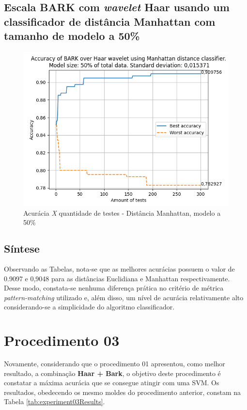 		\newpage
		\subsection{Escala BARK com \textit{wavelet} Haar usando um classificador de distância Manhattan com tamanho de modelo a 50\%}
			\begin{figure}[ht]
				\centering
				\includegraphics{images/results/confusionMatrices/classifier_Manhattan_50.png}
				\caption{Acurácia \textit{X} quantidade de testes - Distância Manhattan, modelo a 50\%}
				\label{fig:classifiermanhattan50}
			\end{figure}
			
			
		\subsection{Síntese}
			\par Observando as Tabelas, nota-se que as melhores acurácias possuem o valor de 0.9097 e 0,9048 para as distâncias Euclidiana e Manhattan respectivamente.  Desse modo, constata-se nenhuma diferença prática no critério de métrica \textit{pattern-matching} utilizado e, além disso, um nível de acurácia relativamente alto considerando-se a simplicidade do algoritmo classificador.
	
	\section{Procedimento 03}
		\label{chap:testsResults:sec:Experimento03}
		\par Novamente, considerando que o procedimento 01 apresentou, como melhor resultado, a combinação \textbf{Haar + Bark}, o objetivo deste procedimento é constatar a máxima acurácia que se consegue atingir com uma SVM. Os resultados, obedecendo os mesmo moldes do procedimento anterior, constam na Tabela \ref{tab:experiment03Results}. 
		
